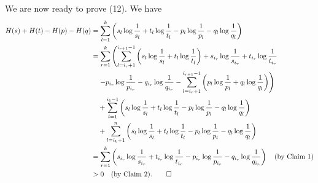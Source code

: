     We are now ready to prove (12). We have
    \begin{align*}
    H(s) + H(t) - H(p) - H(q)
    &= \sum_{l=1}^{k} \left( s_l \log \frac{1}{s_l} + t_l \log \frac{1}{t_l} - p_l \log \frac{1}{p_l} - q_l \log \frac{1}{q_l} \right) \\
    &= \sum_{r=1}^{k} \left( \sum_{l=i_r+1}^{i_{r+1}-1} \left( s_l \log \frac{1}{s_l} + t_l \log \frac{1}{t_l} \right)
    + s_{i_r} \log \frac{1}{s_{i_r}} + t_{i_r} \log \frac{1}{t_{i_r}} \right. \\
    &\quad \left. - p_{i_r} \log \frac{1}{p_{i_r}} - q_{i_r} \log \frac{1}{q_{i_r}} 
    - \sum_{l=i_r+1}^{i_{r+1}-1} \left( p_l \log \frac{1}{p_l} + q_l \log \frac{1}{q_l} \right) \right) \\
    &\quad + \sum_{l=1}^{i_1 - 1} \left( s_l \log \frac{1}{s_l} + t_l \log \frac{1}{t_l} 
    - p_l \log \frac{1}{p_l} - q_l \log \frac{1}{q_l} \right) \\
    &\quad + \sum_{l=i_k+1}^{n} \left( s_l \log \frac{1}{s_l} + t_l \log \frac{1}{t_l} 
    - p_l \log \frac{1}{p_l} - q_l \log \frac{1}{q_l} \right) \\
    &= \sum_{r=1}^{k} \left( s_{i_r} \log \frac{1}{s_{i_r}} + t_{i_r} \log \frac{1}{t_{i_r}} 
    - p_{i_r} \log \frac{1}{p_{i_r}} - q_{i_r} \log \frac{1}{q_{i_r}} \right) 
    \quad \text{(by Claim 1)} \\
    &> 0 \quad \text{(by Claim 2).} \qedhere
    \end{align*}